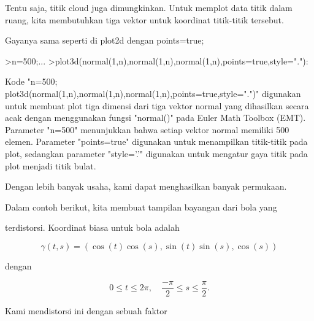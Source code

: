 \documentclass{article}
\begin{document}
\begin{eulernotebook}
\begin{eulercomment}
\begin{eulercomment}
\begin{eulercomment}
\begin{eulercomment}
\begin{eulercomment}
\end{eulercomment}
\begin{eulercomment}
Tentu saja, titik cloud juga dimungkinkan. Untuk memplot data titik
dalam ruang, kita membutuhkan tiga vektor untuk koordinat titik-titik
tersebut.

Gayanya sama seperti di plot2d dengan points=true;
\end{eulercomment}
\begin{eulerprompt}
>n=500;...
>plot3d(normal(1,n),normal(1,n),normal(1,n),points=true,style="."):
\end{eulerprompt}
\begin{eulercomment}
Kode "n=500;
plot3d(normal(1,n),normal(1,n),normal(1,n),points=true,style=".")"
digunakan untuk membuat plot tiga dimensi dari tiga vektor normal yang
dihasilkan secara acak dengan menggunakan fungsi "normal()" pada Euler
Math Toolbox (EMT). Parameter "n=500" menunjukkan bahwa setiap vektor
normal memiliki 500 elemen. Parameter "points=true" digunakan untuk
menampilkan titik-titik pada plot, sedangkan parameter "style='.'"
digunakan untuk mengatur gaya titik pada plot menjadi titik bulat.

\end{eulercomment}
\begin{eulercomment}
\end{eulercomment}
\begin{eulerttcomment}
 Dengan lebih banyak usaha, kami dapat menghasilkan banyak permukaan.
\end{eulerttcomment}
\begin{eulercomment}
\end{eulercomment}
\begin{eulerttcomment}
 Dalam contoh berikut, kita membuat tampilan bayangan dari bola yang
\end{eulerttcomment}
\begin{eulercomment}
terdistorsi. Koordinat biasa untuk bola adalah

\end{eulercomment}
\begin{eulerformula}
\[
\gamma(t,s) = (\cos(t)\cos(s),\sin(t)\sin(s),\cos(s))
\]
\end{eulerformula}
\begin{eulercomment}
dengan

\end{eulercomment}
\begin{eulerformula}
\[
0 \le t \le 2\pi, \quad \frac{-\pi}{2} \le s \le \frac{\pi}{2}.
\]
\end{eulerformula}
\begin{eulercomment}
Kami mendistorsi ini dengan sebuah faktor


\end{eulercomment}
\end{eulercomment}
\end{eulercomment}
\end{eulercomment}
\end{eulercomment}
\end{eulernotebook}
\end{document}
